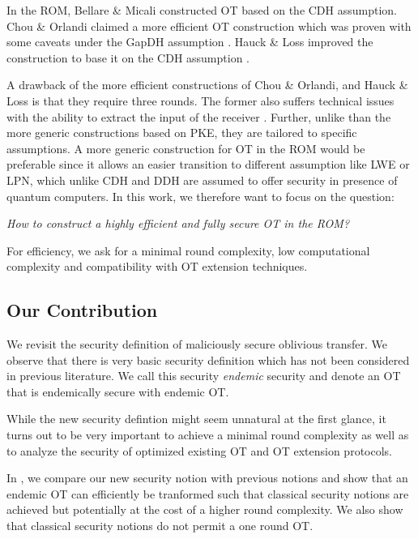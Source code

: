 In the ROM, Bellare \& Micali \cite{C:BelMic89} constructed OT based on the CDH assumption. Chou \& Orlandi \cite{LC:ChoOrl15} claimed a more efficient OT construction which was proven with some caveats under the GapDH assumption \cite{cryptoeprint:2017:1011}. Hauck \& Loss improved the construction to base it on the CDH assumption \cite{cryptoeprint:2017:1011}.

A drawback of the more efficient constructions of Chou \& Orlandi, and Hauck \& Loss is that they require three rounds. The former also suffers technical issues with the ability to extract the input of the receiver \cite{LC:ChoOrl15}. Further, unlike than the more generic constructions based on PKE, they are tailored to specific assumptions. A more generic construction for OT in the ROM would be preferable since it allows an easier transition to different assumption like LWE or LPN, which unlike CDH and DDH are assumed to offer security in presence of quantum computers. In this work, we therefore want to focus on the question:

\begin{center}
\emph{How to construct a highly efficient and fully secure OT in the ROM?}
\end{center}

For efficiency, we ask for a minimal round complexity, low computational complexity and compatibility with OT extension techniques.

\subsection{Our Contribution}

We revisit the security definition of maliciously secure oblivious transfer. We observe that there is very basic security definition which has not been considered in previous literature. We call this security \emph{endemic} security and denote an OT that is endemically secure with endemic OT. 

While the new security defintion might seem unnatural at the first glance, it turns out to be very important to achieve a minimal round complexity as well as to analyze the security of optimized existing OT and OT extension protocols.

In , we compare our new security notion with previous notions and show that an endemic OT can efficiently  be tranformed such that classical security notions are achieved but potentially at the cost of a higher round complexity. We also show that classical security notions do not permit a one round OT.

